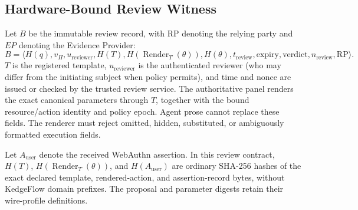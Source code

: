 \subsection{Hardware-Bound Review Witness}
\label{sec:hitl-witness}
Let $B$ be the immutable review record, with $\mathrm{RP}$ denoting the relying party and $EP$ denoting the Evidence Provider:
\begin{equation}
B=\langle H(q),v_\Pi,u_{\mathrm{reviewer}},H(T),H(\operatorname{Render}_T(\theta)),
H(\theta),t_{\mathrm{review}},\mathrm{expiry},\mathrm{verdict},n_{\mathrm{review}},\mathrm{RP}\rangle .
\end{equation}
$T$ is the registered template, $u_{\mathrm{reviewer}}$ is the authenticated reviewer (who may differ from the initiating subject when policy permits), and time and nonce are issued or checked by the trusted review service. The authoritative panel renders the exact canonical parameters through $T$, together with the bound resource/action identity and policy epoch. Agent prose cannot replace these fields. The renderer must reject omitted, hidden, substituted, or ambiguously formatted execution fields.

Let $A_{\mathrm{user}}$ denote the received WebAuthn assertion. In this review contract, $H(T)$, $H(\operatorname{Render}_T(\theta))$, and $H(A_{\mathrm{user}})$ are ordinary SHA-256 hashes of the exact declared template, rendered-action, and assertion-record bytes, without KedgeFlow domain prefixes. The proposal and parameter digests retain their wire-profile definitions.

